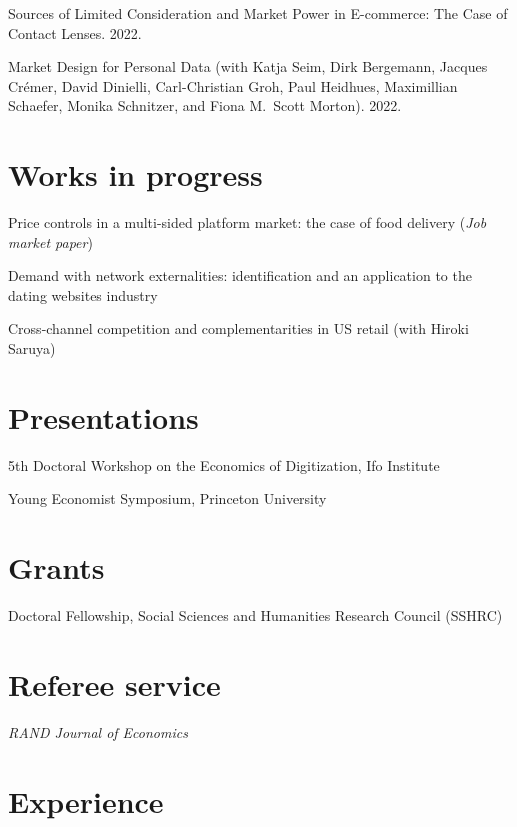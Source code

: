 \documentclass[11pt]{article} %
\begin{document}
Sources of Limited Consideration and Market Power in E-commerce: The Case of
Contact Lenses. 2022.

\medskip

Market Design for Personal Data
(with Katja Seim, Dirk Bergemann, Jacques Cr\'{e}mer, David Dinielli, 
Carl-Christian Groh, Paul Heidhues, Maximillian Schaefer, 
Monika Schnitzer, and Fiona M.\ Scott Morton).
2022.



\section*{Works in progress}

Price controls in a multi-sided platform market: the case of food delivery (\textit{Job market paper})

\medskip

Demand with network externalities: identification and an application to the dating websites industry

\medskip

Cross-channel competition and complementarities in US retail
(with Hiroki Saruya)




\section*{Presentations}

 5th Doctoral Workshop on the Economics of Digitization, Ifo Institute


 Young Economist Symposium, Princeton University

\section*{Grants}

 Doctoral Fellowship, Social Sciences and Humanities Research Council (SSHRC)


\section*{Referee service}

\textit{RAND Journal of Economics}

\section*{Experience}
\end{document}
